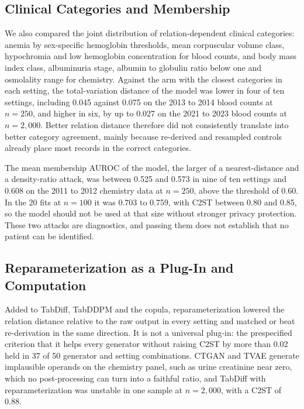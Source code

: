 \documentclass[conference]{IEEEtran}
\begin{document}
\subsection*{Clinical Categories and Membership}

We also compared the joint distribution of relation-dependent clinical categories: anemia by sex-specific hemoglobin thresholds, mean corpuscular volume class, hypochromia and low hemoglobin concentration for blood counts, and body mass index class, albuminuria stage, albumin to globulin ratio below one and osmolality range for chemistry. Against the arm with the closest categories in each setting, the total-variation distance of the model was lower in four of ten settings, including 0.045 against 0.075 on the 2013 to 2014 blood counts at $n = 250$, and higher in six, by up to 0.027 on the 2021 to 2023 blood counts at $n = 2{,}000$. Better relation distance therefore did not consistently translate into better category agreement, mainly because re-derived and resampled controls already place most records in the correct categories.

The mean membership AUROC of the model, the larger of a nearest-distance and a density-ratio attack, was between 0.525 and 0.573 in nine of ten settings and 0.608 on the 2011 to 2012 chemistry data at $n = 250$, above the threshold of 0.60. In the 20 fits at $n = 100$ it was 0.703 to 0.759, with C2ST between 0.80 and 0.85, so the model should not be used at that size without stronger privacy protection. These two attacks are diagnostics, and passing them does not establish that no patient can be identified.

\subsection*{Reparameterization as a Plug-In and Computation}

Added to TabDiff, TabDDPM and the copula, reparameterization lowered the relation distance relative to the raw output in every setting and matched or beat re-derivation in the same direction. It is not a universal plug-in: the prespecified criterion that it helps every generator without raising C2ST by more than 0.02 held in 37 of 50 generator and setting combinations. CTGAN and TVAE generate implausible operands on the chemistry panel, such as urine creatinine near zero, which no post-processing can turn into a faithful ratio, and TabDiff with reparameterization was unstable in one sample at $n = 2{,}000$, with a C2ST of 0.88.
\end{document}

